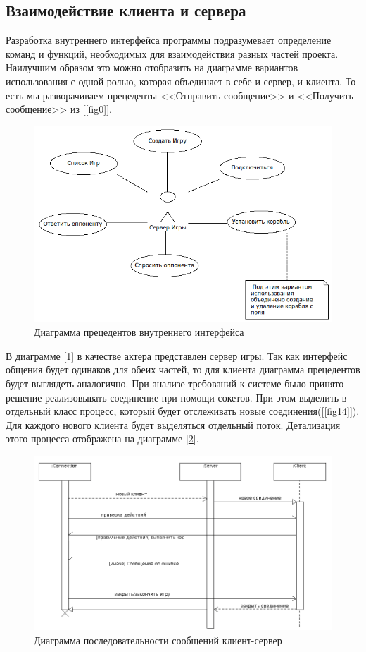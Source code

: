 ﻿\subsection{Взаимодействие клиента и сервера}
  Разработка внутреннего интерфейса программы подразумевает определение команд и функций, необходимых для взаимодействия разных частей проекта. Наилучшим образом это можно отобразить на диаграмме вариантов использования с одной ролью, которая объединяет в себе и сервер, и клиента. То есть мы разворачиваем прецеденты <<Отправить сообщение>> и <<Получить сообщение>> из [\ref{fig0}].  

\begin{figure}[ht]
\centering
\includegraphics[width=15cm]{images/interface.png}
\caption{Диаграмма прецедентов внутреннего интерфейса}
\label{fig3}
\end{figure}

В диаграмме [\ref{fig3}] в качестве актера представлен сервер игры. Так как интерфейс общения будет одинаков для обеих частей, то для клиента диаграмма прецедентов будет выглядеть аналогично. При анализе требований к системе было принято решение реализовывать соединение при помощи сокетов. При этом выделить в отдельный класс процесс, который будет отслеживать новые соединения([\ref{fig14}]). Для каждого нового клиента будет выделяться отдельный поток. Детализация этого процесса отображена на диаграмме [\ref{fig4}].

\begin{figure}[ht]
\centering
\includegraphics[width=16cm]{images/par.png}
\caption{Диаграмма последовательности сообщений клиент-сервер}
\label{fig4}
\end{figure}

